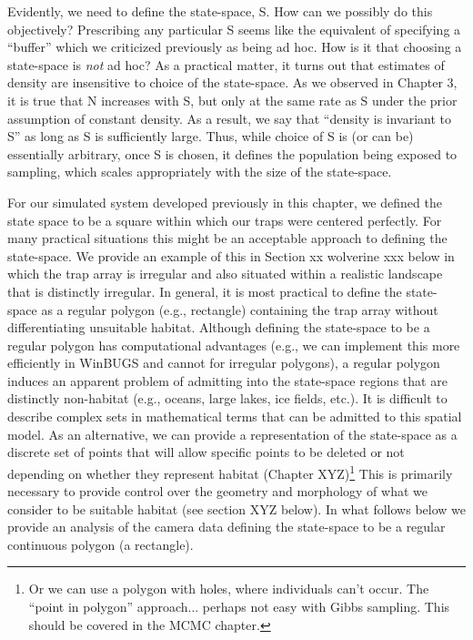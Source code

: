 Evidently, we need to define the state-space, S. How can we possibly
do this objectively? Prescribing any particular S seems like the
equivalent of specifying a ``buffer'' which we criticized previously
as being ad hoc. How is it that choosing a state-space is {\it not} ad
hoc? As a practical matter, it turns out that estimates of density are
insensitive to choice of the state-space. As we observed in Chapter 3,
it is true that N increases with S, but only at the same rate as S
under the prior assumption of constant density. As a result, we say
that ``density is invariant to S'' as long as S is sufficiently
large. Thus, while choice of S is (or can be) essentially arbitrary,
once S is chosen, it defines the population being exposed to sampling,
which scales appropriately with the size of the state-space.

For our simulated system developed previously in this chapter, we
defined the state space to be a square within which our traps were
centered perfectly. For many practical situations this might be an
acceptable approach to defining the state-space. We provide an example
of this in Section xx wolverine xxx below in which the trap array is
irregular and also situated within a realistic landscape that is
distinctly irregular.  In general, it is most practical to define the
state-space as a regular polygon (e.g., rectangle) containing the trap
array without differentiating unsuitable habitat. Although defining
the state-space to be a regular polygon has computational advantages
(e.g., we can implement this more efficiently in WinBUGS and cannot
for irregular polygons), a regular polygon induces an apparent problem
of admitting into the state-space regions that are distinctly
non-habitat (e.g., oceans, large lakes, ice fields, etc.).  It is
difficult to describe complex sets in mathematical terms that can be
admitted to this spatial model. As an alternative, we can provide a
representation of the state-space as a discrete set of points that
will allow specific points to be deleted or not depending on whether
they represent habitat (Chapter XYZ)\footnote{ Or we can use a polygon
  with holes, where individuals can't occur. The ``point in polygon''
  approach... perhaps not easy with Gibbs sampling.  This should be
  covered in the MCMC chapter.}  This is primarily necessary to
provide control over the geometry and morphology of what we consider
to be suitable habitat (see section XYZ below). In what follows below
we provide an analysis of the camera data defining the state-space to
be a regular continuous polygon (a rectangle).


